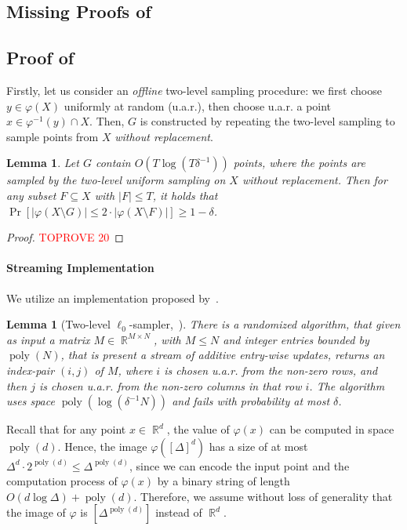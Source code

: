 \documentclass[letterpaper,11pt]{article}
\theoremstyle{plain}
\newtheorem{lemma}[theorem]{Lemma}
\theoremstyle{definition}
\theoremstyle{remark}
\DeclareMathOperator{\R}{\mathbb{R}}
\DeclareMathOperator{\poly}{poly}
\renewcommand{\phi}{\varphi}
\begin{document}
\begin{appendices}
\section{Missing Proofs of~}
\subsection{Proof of~}
\label{apd:isolated}

\ExtractIsolatedPoint*


Firstly, let us consider an \emph{offline} two-level sampling procedure:
we first choose $y\in \phi(X)$ uniformly at random (u.a.r.), then choose u.a.r. a point $x\in \phi^{-1}(y)\cap X$. Then, $G$ is constructed by repeating the two-level sampling to sample points from $X$ \emph{without replacement}.
\begin{lemma}
    \label{lem:offline isolated}
    Let $G$ contain $O(T\log(T\delta^{-1}))$ points, where the points are sampled by the two-level uniform sampling on $X$ without replacement. Then for any subset $F\subseteq X$ with $|F|\le T$, it holds that $\Pr\left[|\phi(X\setminus G)|\le 2\cdot |\phi(X\setminus F)|\right]\ge 1-\delta$.
\end{lemma}
\begin{proof}\textcolor{red}{TOPROVE 20}\end{proof}

    \paragraph{Streaming Implementation}
    We utilize an implementation proposed by~\cite{arxiv.2204.02095}.
    \begin{lemma}[Two-level $\ell_0$-sampler,~{\cite[Lemma 3.3]{arxiv.2204.02095}}]
        \label{lem:two-level sampler}
        There is a randomized algorithm, that given as input a matrix $M\in \R^{M\times N}$, with $M\le N$ and integer entries bounded by $\poly(N)$, that is present a stream of additive entry-wise updates, returns an index-pair $(i,j)$ of $M$, where $i$ is chosen u.a.r. from the non-zero rows, and then $j$ is chosen u.a.r. from the non-zero columns in that row $i$. The algorithm uses space $\poly(\log (\delta^{-1}N))$ and fails with probability at most $\delta$.
    \end{lemma}
    Recall that for any point $x\in \R^d$, the value of $\phi(x)$ can be computed in space $\poly(d)$.
    Hence, the image $\phi([\Delta]^d)$ has a size of at most $\Delta^d \cdot 2^{\poly(d)}\le \Delta^{\poly(d)}$, since we can encode the input point and the computation process of $\phi(x)$ by a binary string of length $O(d\log\Delta) + \poly(d)$. 
    Therefore, we assume without loss of generality that the image of $\phi$ is $[\Delta^{\poly(d)}]$ instead of $\R^d$.
    

\end{appendices}
\end{document}

